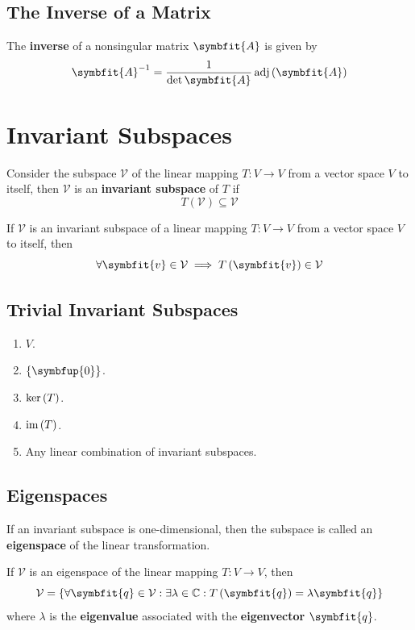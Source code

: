 \documentclass{article}
\begin{document}
	\subsection{The Inverse of a Matrix}
	\begin{theorem}
		The \textbf{inverse} of a nonsingular matrix $\symbfit{A}$ is given by 
		\begin{equation*}
			\symbfit{A}^{-1}=\frac{1}{\det{\symbfit{A}}} \adj{\left( \symbfit{A} \right)}
		\end{equation*}
	\end{theorem}
	\newpage
\section{Invariant Subspaces}
	\begin{definition}
		Consider the subspace $\mathcal{V}$ of the linear mapping $T:V\rightarrow V$ from a vector space $V$ to itself, then $\mathcal{V}$ is an \textbf{invariant subspace} of $T$ if
		\begin{equation*}
			T\left(\mathcal{V}\right)\subseteq \mathcal{V}
		\end{equation*}
	\end{definition}
	\begin{theorem}
		If $\mathcal{V}$ is an invariant subspace of a linear mapping $T: V \rightarrow V$ from a vector space $V$ to itself, then
		\begin{equation*}
			\forall \symbfit{v}\in \mathcal{V}\implies T\left(\symbfit{v}\right)\in \mathcal{V}
		\end{equation*}
	\end{theorem}
	\subsection{Trivial Invariant Subspaces}
	\begin{enumerate}
		\item $V$.
		\item $\left\{ \symbfup{0} \right\}$.
		\item $\operatorname{ker}{\left( T \right)}$.
		\item $\operatorname{im}{\left( T \right)}$.
		\item Any linear combination of invariant subspaces.
	\end{enumerate}
	\subsection{Eigenspaces}
	\begin{definition}
		If an invariant subspace is one-dimensional, then the subspace is called an \textbf{eigenspace} of the linear transformation.
	\end{definition}
	\begin{theorem}
		If $\mathcal{V}$ is an eigenspace of the linear mapping $T: V \rightarrow V$, then
		\begin{equation*}
			\mathcal{V} = \left\{ \forall \symbfit{q}\in \mathcal{V}:\exists \lambda \in \mathbb{C}:T\left(\symbfit{q}\right)=\lambda \symbfit{q} \right\}
		\end{equation*}
		where $\lambda$ is the \textbf{eigenvalue} associated with the \textbf{eigenvector} $\symbfit{q}$.
	\end{theorem}
\end{document}
